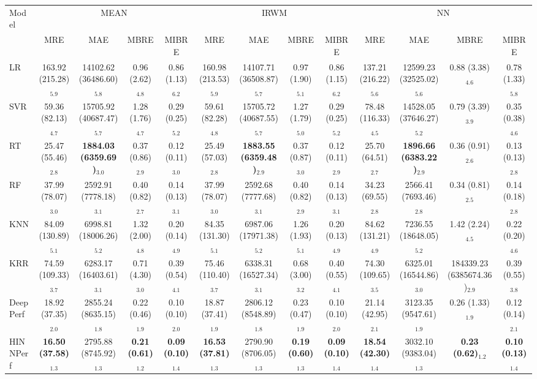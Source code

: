\begin{tabular}{lcccccccccccc}
\toprule
Model & \multicolumn{4}{c}{MEAN} & \multicolumn{4}{c}{IRWM} & \multicolumn{4}{c}{NN} \\
& MRE & MAE & MBRE & MIBRE & MRE & MAE & MBRE & MIBRE & MRE & MAE & MBRE & MIBRE \\
\midrule
LR & 163.92 (215.28)$_{5.9}$ & 14102.62 (36486.60)$_{5.8}$ & 0.96 (2.62)$_{4.8}$ & 0.86 (1.13)$_{6.2}$ & 160.98 (213.53)$_{5.9}$ & 14107.71 (36508.87)$_{5.7}$ & 0.97 (1.90)$_{5.1}$ & 0.86 (1.15)$_{6.2}$ & 137.21 (216.22)$_{5.6}$ & 12599.23 (32525.02)$_{5.6}$ & 0.88 (3.38)$_{4.6}$ & 0.78 (1.33)$_{5.8}$ \\
SVR & 59.36 (82.13)$_{4.7}$ & 15705.92 (40687.47)$_{5.7}$ & 1.28 (1.76)$_{4.7}$ & 0.29 (0.25)$_{5.2}$ & 59.61 (82.28)$_{4.8}$ & 15705.72 (40687.55)$_{5.7}$ & 1.27 (1.79)$_{5.0}$ & 0.29 (0.25)$_{5.2}$ & 78.48 (116.33)$_{4.5}$ & 14528.05 (37646.27)$_{5.2}$ & 0.79 (3.39)$_{3.9}$ & 0.35 (0.38)$_{4.6}$ \\
RT & 25.47 (55.46)$_{2.8}$ & \textbf{1884.03 (6359.69)$_{3.0}$} & 0.37 (0.86)$_{2.9}$ & 0.12 (0.11)$_{3.0}$ & 25.49 (57.03)$_{2.8}$ & \textbf{1883.55 (6359.48)$_{2.9}$} & 0.37 (0.87)$_{3.0}$ & 0.12 (0.11)$_{2.9}$ & 25.70 (64.51)$_{2.7}$ & \textbf{1896.66 (6383.22)$_{2.9}$} & 0.36 (0.91)$_{2.6}$ & 0.13 (0.13)$_{2.8}$ \\
RF & 37.99 (78.07)$_{3.0}$ & 2592.91 (7778.18)$_{3.1}$ & 0.40 (0.82)$_{2.7}$ & 0.14 (0.13)$_{3.1}$ & 37.99 (78.07)$_{3.0}$ & 2592.68 (7777.68)$_{3.1}$ & 0.40 (0.82)$_{2.9}$ & 0.14 (0.13)$_{3.1}$ & 34.23 (69.55)$_{2.8}$ & 2566.41 (7693.46)$_{2.8}$ & 0.34 (0.81)$_{2.5}$ & 0.14 (0.18)$_{2.8}$ \\
KNN & 84.09 (130.89)$_{5.1}$ & 6998.81 (18006.26)$_{5.2}$ & 1.32 (2.00)$_{4.8}$ & 0.20 (0.14)$_{4.9}$ & 84.35 (131.30)$_{5.1}$ & 6987.06 (17971.38)$_{5.2}$ & 1.26 (1.93)$_{5.1}$ & 0.20 (0.13)$_{4.9}$ & 84.62 (131.21)$_{4.9}$ & 7236.55 (18648.05)$_{5.2}$ & 1.42 (2.24)$_{4.5}$ & 0.22 (0.20)$_{4.6}$ \\
KRR & 74.59 (109.33)$_{3.7}$ & 6283.17 (16403.61)$_{3.1}$ & 0.71 (4.30)$_{3.0}$ & 0.39 (0.54)$_{4.1}$ & 75.46 (110.40)$_{3.7}$ & 6338.31 (16527.34)$_{3.1}$ & 0.68 (3.00)$_{3.2}$ & 0.40 (0.55)$_{4.1}$ & 74.30 (109.65)$_{3.5}$ & 6325.01 (16544.86)$_{3.0}$ & 184339.23 (6385674.36)$_{2.9}$ & 0.39 (0.55)$_{3.8}$ \\
DeepPerf & 18.92 (37.35)$_{2.0}$ & 2855.24 (8635.15)$_{1.8}$ & 0.22 (0.46)$_{1.9}$ & 0.10 (0.10)$_{2.0}$ & 18.87 (37.41)$_{1.9}$ & 2806.12 (8548.89)$_{1.8}$ & 0.23 (0.47)$_{1.9}$ & 0.10 (0.10)$_{2.0}$ & 21.14 (42.95)$_{2.1}$ & 3123.35 (9547.61)$_{1.9}$ & 0.26 (1.33)$_{1.9}$ & 0.12 (0.14)$_{2.1}$ \\
HINNPerf & \textbf{16.50 (37.58)$_{1.3}$} & 2795.88 (8745.92)$_{1.3}$ & \textbf{0.21 (0.61)$_{1.2}$} & \textbf{0.09 (0.10)$_{1.4}$} & \textbf{16.53 (37.81)$_{1.3}$} & 2790.90 (8706.05)$_{1.3}$ & \textbf{0.19 (0.60)$_{1.3}$} & \textbf{0.09 (0.10)$_{1.4}$} & \textbf{18.54 (42.30)$_{1.4}$} & 3032.10 (9383.04)$_{1.3}$ & \textbf{0.23 (0.62)$_{1.2}$} & \textbf{0.10 (0.13)$_{1.4}$} \\
\bottomrule
\end{tabular}

